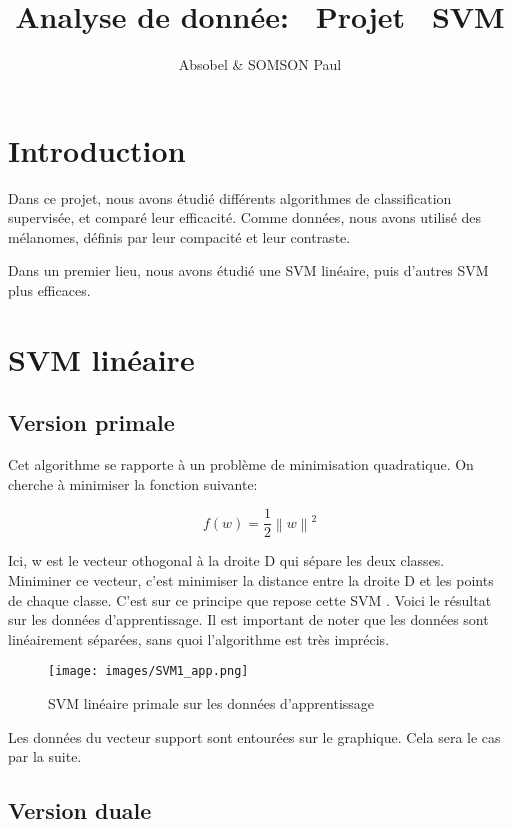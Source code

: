 \documentclass{article}
\title{Analyse de donnée: \
Projet \
SVM}
\author{Absobel \& SOMSON Paul}
\date{}
\begin{document}
\maketitle

\section*{Introduction}

Dans ce projet, nous avons étudié différents algorithmes de classification supervisée, et comparé leur efficacité. Comme données, nous avons utilisé des mélanomes, définis par leur compacité et leur contraste.

Dans un premier lieu, nous avons étudié une SVM linéaire, puis d'autres SVM plus efficaces.

\section{SVM linéaire}

\subsection{Version primale}

Cet algorithme se rapporte à un problème de minimisation quadratique. On cherche à minimiser la fonction suivante:

\begin{equation}
    f(w) = \frac{1}{2} \left\| w \right\|^2
\end{equation}

Ici, w est le vecteur othogonal à la droite D qui sépare les deux classes. Miniminer ce vecteur, c'est minimiser la distance entre la droite D et les points de chaque classe. C'est sur ce principe que repose cette SVM \@.
Voici le résultat sur les données d'apprentissage. Il est important de noter que les données sont linéairement séparées, sans quoi l'algorithme est très imprécis.

\begin{figure}[H]
    \centering
    \texttt{[image: images/SVM1\_app.png]}
    \caption{SVM linéaire primale sur les données d'apprentissage}
\end{figure}

Les données du vecteur support sont entourées sur le graphique. Cela sera le cas par la suite.

\subsection{Version duale}
\end{document}
